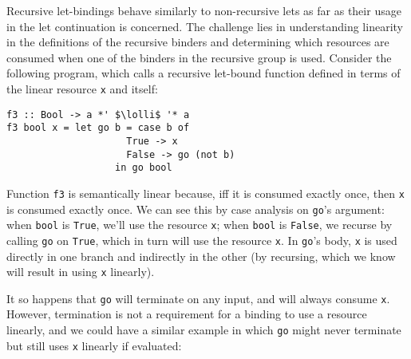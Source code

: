 \documentclass[acmsmall,review,anonymous,screen]{acmart}
\newcommand{\incode}[1]{\lstinline{#1}}
\newcommand{\lolli}{\multimap}
\begin{document}
Recursive let-bindings
behave similarly to non-recursive lets as far as their usage in the let
continuation is concerned.
%
The challenge lies in understanding linearity in the definitions of the
recursive binders and determining which resources are consumed when one of the
binders in the recursive group is used.
%
Consider the following program, which calls a recursive let-bound function
defined in terms of the linear resource \incode{x} and itself:
%
\begin{notyet}
\begin{lstlisting}
f3 :: Bool -> a *' $\lolli$ '* a
f3 bool x = let go b = case b of
                     True -> x
                     False -> go (not b)
                   in go bool
\end{lstlisting}
\end{notyet}
%
Function \incode{f3} is semantically linear because, iff it is consumed exactly once,
then \incode{x} is consumed exactly once. We can see this by case analysis on \incode{go}'s argument:
when \incode{bool} is \incode{True}, we'll use the resource \incode{x};
 when \incode{bool} is \incode{False}, we recurse by calling \incode{go} on \incode{True}, which in turn will use the resource \incode{x}.
In \incode{go}'s body, \incode{x} is used directly in one branch and indirectly in the
other (by recursing, which we know will result in using \incode{x} linearly).
%

It so happens that \incode{go} will terminate on any input, and will always consume
\incode{x}. However, termination is not a requirement for a binding to use a resource linearly,
and we could have a similar example in which \incode{go} might never terminate but still
uses \incode{x} linearly if evaluated:
\end{document}
